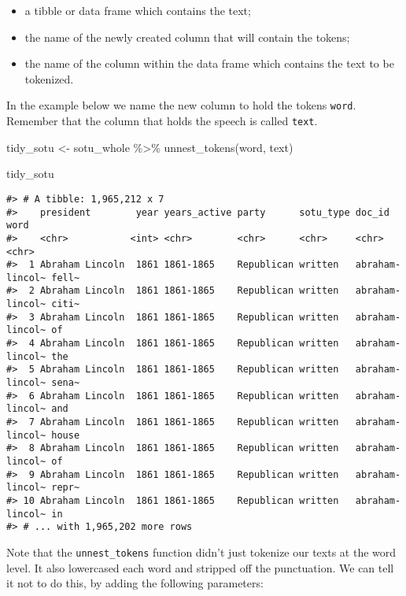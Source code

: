 \documentclass[
]{book}
\newenvironment{Shaded}{\begin{snugshade}}{\end{snugshade}}
\newcommand{\FunctionTok}[1]{\textcolor[rgb]{0.00,0.00,0.00}{#1}}
\newcommand{\NormalTok}[1]{#1}
\newcommand{\OtherTok}[1]{\textcolor[rgb]{0.56,0.35,0.01}{#1}}
\newcommand{\SpecialCharTok}[1]{\textcolor[rgb]{0.00,0.00,0.00}{#1}}
\providecommand{\tightlist}{%
  \setlength{\itemsep}{0pt}\setlength{\parskip}{0pt}}
\begin{document}
\begin{itemize}
\tightlist
\item
  a tibble or data frame which contains the text;
\item
  the name of the newly created column that will contain the tokens;
\item
  the name of the column within the data frame which contains the text to be tokenized.
\end{itemize}

In the example below we name the new column to hold the tokens \texttt{word}. Remember that the column that holds the speech is called \texttt{text}.

\begin{Shaded}
\begin{Highlighting}[]
\NormalTok{tidy\_sotu }\OtherTok{\textless{}{-}}\NormalTok{ sotu\_whole }\SpecialCharTok{\%\textgreater{}\%}
  \FunctionTok{unnest\_tokens}\NormalTok{(word, text)}

\NormalTok{tidy\_sotu}
\end{Highlighting}
\end{Shaded}

\begin{verbatim}
#> # A tibble: 1,965,212 x 7
#>    president        year years_active party      sotu_type doc_id          word 
#>    <chr>           <int> <chr>        <chr>      <chr>     <chr>           <chr>
#>  1 Abraham Lincoln  1861 1861-1865    Republican written   abraham-lincol~ fell~
#>  2 Abraham Lincoln  1861 1861-1865    Republican written   abraham-lincol~ citi~
#>  3 Abraham Lincoln  1861 1861-1865    Republican written   abraham-lincol~ of   
#>  4 Abraham Lincoln  1861 1861-1865    Republican written   abraham-lincol~ the  
#>  5 Abraham Lincoln  1861 1861-1865    Republican written   abraham-lincol~ sena~
#>  6 Abraham Lincoln  1861 1861-1865    Republican written   abraham-lincol~ and  
#>  7 Abraham Lincoln  1861 1861-1865    Republican written   abraham-lincol~ house
#>  8 Abraham Lincoln  1861 1861-1865    Republican written   abraham-lincol~ of   
#>  9 Abraham Lincoln  1861 1861-1865    Republican written   abraham-lincol~ repr~
#> 10 Abraham Lincoln  1861 1861-1865    Republican written   abraham-lincol~ in   
#> # ... with 1,965,202 more rows
\end{verbatim}

Note that the \texttt{unnest\_tokens} function didn't just tokenize our texts at the word level. It also lowercased each word and stripped off the punctuation. We can tell it not to do this, by adding the following parameters:
\end{document}
